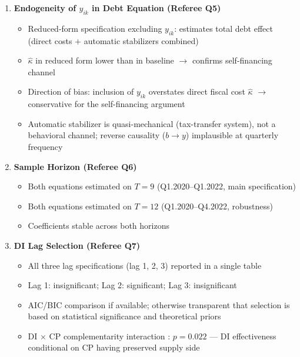 \documentclass[12pt, a4paper]{article}
\begin{document}
\begin{enumerate}
\item \textbf{Endogeneity of $y_{ik}$ in Debt Equation (Referee Q5)}
\begin{itemize}
    \item Reduced-form specification excluding $y_{ik}$: estimates total
        debt effect (direct costs $+$ automatic stabilizers combined)
    \item $\hat{\kappa}$ in reduced form lower than in baseline $\to$
        confirms self-financing channel
    \item Direction of bias: inclusion of $y_{ik}$ overstates direct
        fiscal cost $\hat{\kappa}$ $\to$ conservative for the
        self-financing argument
    \item Automatic stabilizer is quasi-mechanical (tax-transfer system),
        not a behavioral channel; reverse causality ($b \to y$) implausible
        at quarterly frequency
\end{itemize}

\item \textbf{Sample Horizon (Referee Q6)}
\begin{itemize}
    \item Both equations estimated on $T = 9$ (Q1.2020--Q1.2022,
        main specification)
    \item Both equations estimated on $T = 12$ (Q1.2020--Q4.2022,
        robustness)
    \item Coefficients stable across both horizons
\end{itemize}

\item \textbf{DI Lag Selection (Referee Q7)}
\begin{itemize}
    \item All three lag specifications (lag 1, 2, 3) reported in a
        single table
    \item Lag 1: insignificant; Lag 2: significant; Lag 3: insignificant
    \item AIC/BIC comparison if available; otherwise transparent that
        selection is based on statistical significance and theoretical
        priors \citep{Blanchard2002, Ramey2011}
    \item DI $\times$ CP complementarity interaction
        \citep{Guerrieri2022}: $p = 0.022$ --- DI effectiveness
        conditional on CP having preserved supply side
\end{itemize}

\end{enumerate}
\end{document}

